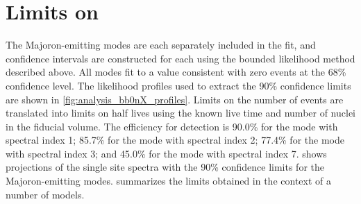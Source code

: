 \documentclass[herrin-thesis.tex]{subfiles}
\begin{document}
\section{Limits on \zeronuXpX{}}
The Majoron-emitting modes are each separately included in the fit, and confidence intervals are constructed for each using the bounded likelihood method described above. All modes fit to a value consistent with zero events at the 68\% confidence level. The likelihood profiles used to extract the 90\% confidence limits are shown in \cref{fig:analysis_bb0nX_profiles}. Limits on the number of events are translated into limits on half lives using the known live time and number of  nuclei in the fiducial volume. The efficiency for detection is 90.0\% for the mode with spectral index 1; 85.7\% for the mode with spectral index 2; 77.4\% for the mode with spectral index 3; and 45.0\% for the mode with spectral index 7.  shows projections of the single site spectra with the 90\% confidence limits for the Majoron-emitting modes.  summarizes the limits obtained in the context of a number of models.
\end{document}

